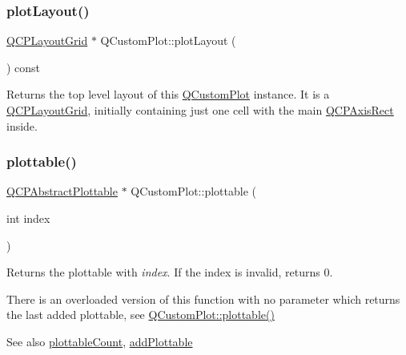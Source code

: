 \subsubsection{\texorpdfstring{plot\+Layout()}{plotLayout()}}
{\footnotesize\ttfamily \hyperlink{class_q_c_p_layout_grid}{Q\+C\+P\+Layout\+Grid} $\ast$ Q\+Custom\+Plot\+::plot\+Layout (\begin{DoxyParamCaption}{ }\end{DoxyParamCaption}) const\hspace{0.3cm}{\ttfamily [inline]}}

Returns the top level layout of this \hyperlink{class_q_custom_plot}{Q\+Custom\+Plot} instance. It is a \hyperlink{class_q_c_p_layout_grid}{Q\+C\+P\+Layout\+Grid}, initially containing just one cell with the main \hyperlink{class_q_c_p_axis_rect}{Q\+C\+P\+Axis\+Rect} inside. \hypertarget{class_q_custom_plot_a32de81ff53e263e785b83b52ecd99d6f}{}\label{class_q_custom_plot_a32de81ff53e263e785b83b52ecd99d6f} 
\subsubsection{\texorpdfstring{plottable()}{plottable()}\hspace{0.1cm}{\footnotesize\ttfamily [1/2]}}
{\footnotesize\ttfamily \hyperlink{class_q_c_p_abstract_plottable}{Q\+C\+P\+Abstract\+Plottable} $\ast$ Q\+Custom\+Plot\+::plottable (\begin{DoxyParamCaption}\item[{int}]{index }\end{DoxyParamCaption})}

Returns the plottable with {\itshape index}. If the index is invalid, returns 0.

There is an overloaded version of this function with no parameter which returns the last added plottable, see \hyperlink{class_q_custom_plot_adea38bdc660da9412ba69fb939031567}{Q\+Custom\+Plot\+::plottable()}

\begin{DoxySeeAlso}{See also}
\hyperlink{class_q_custom_plot_a5f4f15991c14bf9ad659bb2a19dfbed4}{plottable\+Count}, \hyperlink{class_q_custom_plot_ab7ad9174f701f9c6f64e378df77927a6}{add\+Plottable} 
\end{DoxySeeAlso}
\hypertarget{class_q_custom_plot_adea38bdc660da9412ba69fb939031567}{}\label{class_q_custom_plot_adea38bdc660da9412ba69fb939031567} 
